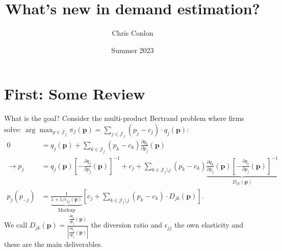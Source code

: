 



\newcommand{\vect}[1]{\boldsymbol{\mathbf{#1}}}
\newcommand{\pd}[2]{\frac{\partial{#1}}{\partial{#2}}}
\newcommand{\expect}[2]{\mathbb{E}_{#1}\left[{#2}\right]}
\newcommand{\expectsmall}[2]{\mathbb{E}_{#1}{#2}}
\newcommand{\expectsuper}[3]{\mathbb{E}_{#1}^{#2}\left[{#3}\right]}
\newcommand{\ind}[1]{\mathbbm{1}\left\{{#1}\right\}}
\newcommand{\prob}[1]{\mathbb{P}\left\{{#1}\right\}}
\newcommand{\derivative}[2]{\frac{d{#2}}{d{#1}}}
\newcommand{\cat}[1]{\citeasnoun{#1}}

\title{What's new in demand estimation?}
\author{Chris Conlon}

\date{Summer 2023}








\begin{frame}[plain] %
\titlepage
\end{frame}


\section{First: Some Review}

\begin{frame}{What is the goal?}
\small
Consider the multi-product Bertrand problem where firms solve: $\arg \max_{p \in \mathcal{J}_f} \pi_f (\mathbf{p}) = \sum_{j \in \mathcal{J}_f} (p_j - c_j) \cdot q_j(\mathbf{p})$:
\begin{align*}
 0&= q_j(\mathbf{p}) + \sum_{k \in \mathcal{J}_f} (p_k - c_k) \frac{\partial q_{k}}{\partial p_j}(\mathbf{p}) \\
\rightarrow p_j &=q_{j}(\mathbf{p}) \left[-\frac{\partial q_{j}}{\partial p_{j}}(\mathbf{p})\right]^{-1} + c_{j} + \sum_{k \in \mathcal{J}_{f} \setminus j} \left(p_{k}-c_{k}\right) \underbrace{\frac{\partial q_{k}}{\partial p_{j}}(\mathbf{p})\left[-\frac{\partial q_{j}}{\partial p_{j}}(\mathbf{p})\right]^{-1}}_{D_{jk}(\mathbf{p})}\\
p_j(p_{-j}) &= \underbrace{\frac{1}{1+1/\epsilon_{jj}(\mathbf{p})}}_{\text{Markup}} \left[ c_j + \sum_{k \in \mathcal{J}_{f} \setminus j}  (p_k-c_k) \cdot  D_{jk} (\mathbf{p}) \right].
\end{align*}
We call $D_{jk}(\mathbf{p}) = \frac{\frac{\partial q_{k}}{\partial p_j}(\mathbf{p})}{\left| \frac{\partial q_{j}}{\partial p_j}(\mathbf{p}) \right|}$ the \alert{diversion ratio} and $\epsilon_{jj}$ the \alert{own elasticity} and these are the main deliverables.
\end{frame}

